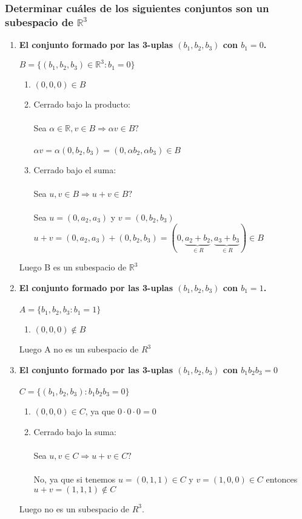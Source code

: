 \documentclass{article}
\begin{document}
\subsubsection{ \textbf{ Determinar cuáles de los siguientes conjuntos son un subespacio de $\mathbb{R}^3$}}
\begin{enumerate}[1.]
\item \textbf{El conjunto formado por las 3-uplas $(b_1,b_2,b_3)$ con $b_1 = 0$.}

$B = \lbrace (b_1,b_2,b_3) \in \mathbb{R}^3 : b_1 = 0 \rbrace$

\begin{enumerate}[(1)]
\item $(0,0,0) \in B$
\item
	Cerrado bajo la producto: \\ \\
	Sea $\alpha \in \mathbb{R}, v \in B \Rightarrow \alpha v \in B?$ \\ \\
	$\alpha v = \alpha (0,b_2,b_3) = (0,\alpha b_2, \alpha b_3) \in B$
\item
	Cerrado bajo el suma: \\ \\
	Sea $u,v \in B \Rightarrow u+v \in B?$\\ \\ 
	Sea $u = (0,a_2,a_3)$ y $v = (0,b_2,b_3)$ \\
	$u+v = (0,a_2,a_3) + (0,b_2,b_3) = (0,\underbrace{a_2+b_2}_{\in R},\underbrace{a_3+b_3}_{\in R}) \in B$
\end{enumerate}
Luego B es un subespacio de $\mathbb{R}^3$

\item \textbf{El conjunto formado por las 3-uplas $(b_1,b_2,b_3)$ con $b_1 = 1$.} \\ \\
$A = \lbrace b_1,b_2,b_3 : b_1 = 1\rbrace$
\begin{enumerate}[(1)]
\item
	$(0,0,0) \not \in B$
\end{enumerate}
Luego A no es un subespacio de $R^3$

\item \textbf{El conjunto formado por las 3-uplas $(b_1,b_2,b_3)$ con $b_1b_2b_3 = 0$} \\ \\
$C = \lbrace (b_1,b_2,b_3) : b_1b_2b_3 = 0 \rbrace$


\begin{enumerate}[(1)]
\item
	$(0,0,0) \in C$, ya que $0 \cdot 0 \cdot 0 = 0$
\item
	Cerrado bajo la suma: \\ \\
	Sea $u,v \in C \Rightarrow u+v \in C?$\\ \\
	No, ya que si tenemos $u = (0,1,1) \in C$ y $v = (1,0,0) \in C$ entonces $u+v = (1,1,1) \not \in C$
\end{enumerate}
Luego no es un subespacio de $R^3$.


\end{enumerate}
\end{document}
